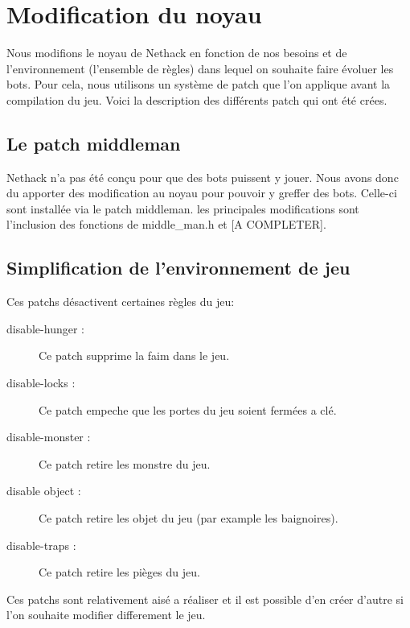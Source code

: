 \chapter{Modification du noyau}

Nous modifions le noyau de Nethack en fonction de nos besoins et de l'environnement (l'ensemble de règles) dans lequel on souhaite faire évoluer les bots. Pour cela, nous utilisons un système de patch que l'on applique avant la compilation du jeu. Voici la description des différents patch qui ont été crées.

\section{Le patch middleman}

Nethack n'a pas été conçu pour que des bots puissent y jouer. Nous avons donc du apporter des modification au noyau pour pouvoir y greffer des bots. Celle-ci sont installée via le patch middleman. les principales modifications sont l'inclusion des fonctions de middle\_man.h et [A COMPLETER].   

\section{Simplification de l'environnement de jeu}

Ces patchs désactivent certaines règles du jeu:
\begin{description}
\item[disable-hunger :] Ce patch supprime la faim dans le jeu.
\item[disable-locks :] Ce patch empeche que les portes du jeu soient fermées a clé.
\item[disable-monster :] Ce patch retire les monstre du jeu.
\item[disable object :] Ce patch retire les objet du jeu (par example les baignoires).
\item[disable-traps :] Ce patch retire les pièges du jeu.
\end{description}

Ces patchs sont relativement aisé a réaliser et il est possible d'en créer d'autre si l'on souhaite modifier differement le jeu.

